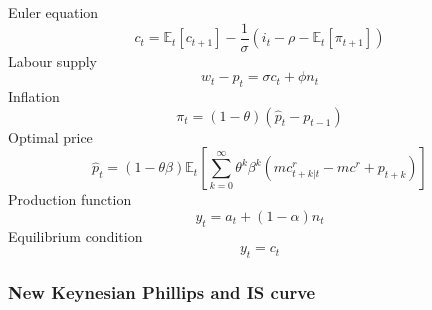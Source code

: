 \documentclass[12pt,a4paper,english]{article} %
\newcommand{\E}{\mathbb{E}} %
\begin{document}
	Euler equation
	\begin{equation} \label{eq:lleuler}
		c_t = \E_t[c_{t+1}] - \frac{1}{\sigma} (i_t - \rho - \E_t [\pi_{t+1}])
	\end{equation}
	Labour supply 
	\begin{equation} \label{eq:llslabour}
		w_t - p_t = \sigma c_t + \phi n_t
	\end{equation}
	Inflation
	\begin{equation}\label{eq:llpi}
		\pi_t = (1 - \theta) (\hat{p}_t - p_{t-1})	
	\end{equation}
	Optimal price 
	\begin{equation}\label{eq:llpstar}
		\hat{p}_t = (1 - \theta \beta) \E_t
		\left[
		\sum_{k=0}^{\infty} \theta^k \beta^k \left( mc_{t+k|t}^r - mc^r +p_{t+k}\right)
		\right]		
	\end{equation}
	Production function
	\begin{equation}\label{eq:llprod}
		y_t = a_t + (1 - \alpha) n_t
	\end{equation}
	Equilibrium condition 
	\begin{equation}\label{eq:lleq}
		y_t = c_t
	\end{equation}

	\subsubsection{New Keynesian Phillips and IS curve}
	
\end{document}
